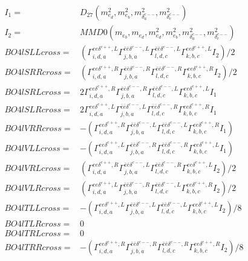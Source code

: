 \documentclass[A4,landscape]{article}
\begin{document}
\begin{align} 
I_1 = & D_{27}(m^2_{e_{{d}}}, m^2_{e_{{b}}}, m^2_{\delta^{c--}_{{a}}}, m^2_{\delta^{c--}_{{c}}}) \\ 
I_2 = & MMD0(m_{e_{{b}}}, m_{e_{{d}}}, m^2_{e_{{d}}}, m^2_{e_{{b}}}, m^2_{\delta^{c--}_{{a}}}, m^2_{\delta^{c--}_{{c}}}) \\ 
  BO4lSLLcross= & ( \Gamma^{e e \delta^{c++},L}_{i, d, a} \Gamma^{\bar{e}\bar{e}\delta^{c--} ,L}_{j, b, a} \Gamma^{\bar{e}\bar{e}\delta^{c--} ,L}_{l, d, c} \Gamma^{e e \delta^{c++},L}_{k, b, c} I_2)/2 \\ 
  BO4lSRRcross= & ( \Gamma^{e e \delta^{c++},R}_{i, d, a} \Gamma^{\bar{e}\bar{e}\delta^{c--} ,R}_{j, b, a} \Gamma^{\bar{e}\bar{e}\delta^{c--} ,R}_{l, d, c} \Gamma^{e e \delta^{c++},R}_{k, b, c} I_2)/2 \\ 
  BO4lSRLcross= & 2  \Gamma^{e e \delta^{c++},R}_{i, d, a} \Gamma^{\bar{e}\bar{e}\delta^{c--} ,R}_{j, b, a} \Gamma^{\bar{e}\bar{e}\delta^{c--} ,L}_{l, d, c} \Gamma^{e e \delta^{c++},L}_{k, b, c} I_1 \\ 
  BO4lSLRcross= & 2  \Gamma^{e e \delta^{c++},L}_{i, d, a} \Gamma^{\bar{e}\bar{e}\delta^{c--} ,L}_{j, b, a} \Gamma^{\bar{e}\bar{e}\delta^{c--} ,R}_{l, d, c} \Gamma^{e e \delta^{c++},R}_{k, b, c} I_1 \\ 
  BO4lVRRcross= & -( \Gamma^{e e \delta^{c++},R}_{i, d, a} \Gamma^{\bar{e}\bar{e}\delta^{c--} ,L}_{j, b, a} \Gamma^{\bar{e}\bar{e}\delta^{c--} ,L}_{l, d, c} \Gamma^{e e \delta^{c++},R}_{k, b, c} I_1) \\ 
  BO4lVLLcross= & -( \Gamma^{e e \delta^{c++},L}_{i, d, a} \Gamma^{\bar{e}\bar{e}\delta^{c--} ,R}_{j, b, a} \Gamma^{\bar{e}\bar{e}\delta^{c--} ,R}_{l, d, c} \Gamma^{e e \delta^{c++},L}_{k, b, c} I_1) \\ 
  BO4lVRLcross= & ( \Gamma^{e e \delta^{c++},R}_{i, d, a} \Gamma^{\bar{e}\bar{e}\delta^{c--} ,L}_{j, b, a} \Gamma^{\bar{e}\bar{e}\delta^{c--} ,R}_{l, d, c} \Gamma^{e e \delta^{c++},L}_{k, b, c} I_2)/2 \\ 
  BO4lVLRcross= & ( \Gamma^{e e \delta^{c++},L}_{i, d, a} \Gamma^{\bar{e}\bar{e}\delta^{c--} ,R}_{j, b, a} \Gamma^{\bar{e}\bar{e}\delta^{c--} ,L}_{l, d, c} \Gamma^{e e \delta^{c++},R}_{k, b, c} I_2)/2 \\ 
  BO4lTLLcross= & -( \Gamma^{e e \delta^{c++},L}_{i, d, a} \Gamma^{\bar{e}\bar{e}\delta^{c--} ,L}_{j, b, a} \Gamma^{\bar{e}\bar{e}\delta^{c--} ,L}_{l, d, c} \Gamma^{e e \delta^{c++},L}_{k, b, c} I_2)/8 \\ 
  BO4lTLRcross= & 0 \\ 
  BO4lTRLcross= & 0 \\ 
  BO4lTRRcross= & -( \Gamma^{e e \delta^{c++},R}_{i, d, a} \Gamma^{\bar{e}\bar{e}\delta^{c--} ,R}_{j, b, a} \Gamma^{\bar{e}\bar{e}\delta^{c--} ,R}_{l, d, c} \Gamma^{e e \delta^{c++},R}_{k, b, c} I_2)/8 \\ 
\end{align} 
\end{document}
